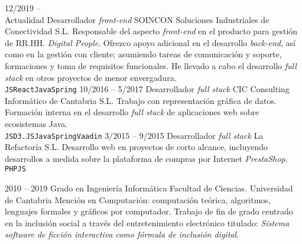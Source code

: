 \documentclass[9pt]{developercv} %
\begin{document}
\begin{entrylist}
	\entry
		{12/2019 --\\ Actualidad}
		{Desarrollador \emph{front-end}}
		{SOINCON Soluciones Industriales de Conectividad S.L.}
		{Responsable del aspecto \emph{front-end} en el producto para gestión de RR.HH. \emph{Digital People}. Ofrezco apoyo adicional en el desarrollo \emph{back-end}, así como en la gestión con cliente; asumiendo tareas de comunicación y soporte, formaciones y toma de requisitos funcionales. He llevado a cabo el desarrollo \emph{full stack} en otros proyectos de menor envergadura.\\ \texttt{JS}\slashsep\texttt{React}\slashsep\texttt{Java}\slashsep\texttt{Spring}}
	\entry
		{10/2016 -- 5/2017}
		{Desarrollador \emph{full stack}}
		{CIC Consulting Informático de Cantabria S.L.}
		{Trabajo con representación gráfica de datos. Formación interna en el desarrollo \emph{full stack} de aplicaciones web sobre ecosistemas Java.\\ \texttt{JS}\slashsep\texttt{D3.JS}\slashsep\texttt{Java}\slashsep\texttt{Spring}\slashsep\texttt{Vaadin}}
	\entry
		{3/2015 -- 9/2015}
		{Desarrollador \emph{full stack}}
		{La Refactoría S.L.}
		{Desarrollo web en proyectos de corto alcance, incluyendo desarrollos a medida sobre la plataforma de compras por Internet \emph{PrestaShop}.\\ \texttt{PHP}\slashsep\texttt{JS}}
\end{entrylist}



\begin{entrylist}
	\entry
		{2010 -- 2019}
		{Grado en Ingeniería Informática}
		{Facultad de Ciencias. Universidad de Cantabria}
		{Mención en Computación: computación teórica, algoritmos, lenguajes formales y gráficos por computador. Trabajo de fin de grado centrado en la inclusión social a través del entretenimiento electrónico titulado: \emph{Sistema software de ficción interactiva como fórmula de inclusión digital}.}
\end{entrylist}

\end{document}
